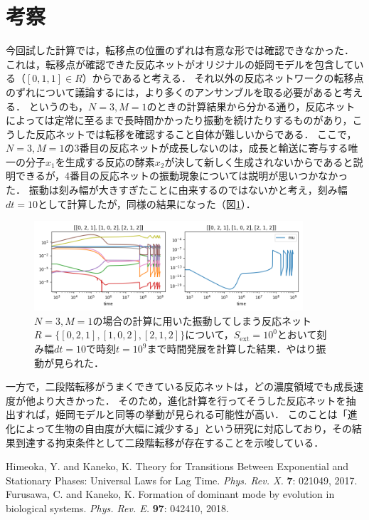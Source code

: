 \documentclass[a4paper,11pt]{jsarticle}
\begin{document}
\section{考察}
今回試した計算では，転移点の位置のずれは有意な形では確認できなかった．
これは，転移点が確認できた反応ネットがオリジナルの姫岡モデルを包含している（$[0,1,1]\in R$）からであると考える．
それ以外の反応ネットワークの転移点のずれについて議論するには，より多くのアンサンブルを取る必要があると考える．
というのも，$N=3,M=1$のときの計算結果から分かる通り，反応ネットによっては定常に至るまで長時間かかったり振動を続けたりするものがあり，こうした反応ネットでは転移を確認すること自体が難しいからである．
ここで，$N=3,M=1$の3番目の反応ネットが成長しないのは，成長と輸送に寄与する唯一の分子$x_1$を生成する反応の酵素$x_2$が決して新しく生成されないからであると説明できるが，4番目の反応ネットの振動現象については説明が思いつかなかった．
振動は刻み幅が大きすぎたことに由来するのではないかと考え，刻み幅$dt=10$として計算したが，同様の結果になった（図\ref{fig:oscil}）．

\begin{figure}[htbp]
  \centering
  \includegraphics[width=10cm]{himeoka_timser_N3_M1_TMAX9_oscil_div8_NPLT6_Sext0.png}
  \caption{$N=3,M=1$の場合の計算に用いた振動してしまう反応ネット$R=\{ [0, 2, 1], [1, 0, 2], [2, 1, 2] \}$について，$S_{\mathrm{ext}}=10^{0}$とおいて刻み幅$dt=10$で時刻$t=10^9$まで時間発展を計算した結果．やはり振動が見られた．}
  \label{fig:oscil}
\end{figure}

一方で，二段階転移がうまくできている反応ネットは，どの濃度領域でも成長速度が他より大きかった．
そのため，進化計算を行ってそうした反応ネットを抽出すれば，姫岡モデルと同等の挙動が見られる可能性が高い．
このことは「進化によって生物の自由度が大幅に減少する」という研究\cite{furusawa}に対応しており，その結果到達する拘束条件として二段階転移が存在することを示唆している．

\begin{thebibliography}{99}
   Himeoka, Y. and Kaneko, K. Theory for Transitions Between Exponential and Stationary Phases:
  Universal Laws for Lag Time. \textit{Phys. Rev. X.} \textbf{7}: 021049, 2017.  
   Furusawa, C. and Kaneko, K. Formation of dominant mode by evolution in biological systems. \textit{Phys. Rev. E.} \textbf{97}: 042410, 2018.  
\end{thebibliography}
\end{document}
